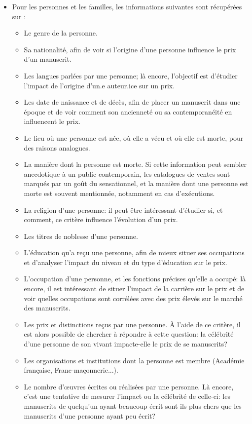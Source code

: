 \begin{itemize}
	\item Pour les personnes et les familles, les informations suivantes sont récupérées sur \wkd{}:
	\begin{itemize}
		\item Le genre de la personne.
		\item Sa nationalité, afin de voir si l'origine d'une personne influence le prix d'un manuscrit.
		\item Les langues parlées par une personne; là encore, l'objectif est d'étudier l'impact de l'origine d'un.e auteur.ice sur un prix.
		\item Les date de naissance et de décès, afin de placer un manuscrit dans une époque et de voir comment son ancienneté ou sa contemporanéité en influencent le prix.
		\item Le lieu où une personne est née, où elle a vécu et où elle est morte, pour des raisons analogues.
		\item La manière dont la personne est morte. Si cette information peut sembler anecdotique à un public contemporain, les catalogues de ventes sont marqués par un goût du sensationnel, et la manière dont une personne est morte est souvent mentionnée, notamment en cas d'exécutions.
		\item La religion d'une personne: il peut être intéressant d'étudier si, et comment, ce critère influence l'évolution d'un prix.
		\item Les titres de noblesse d'une personne.
		\item L'éducation qu'a reçu une personne, afin de mieux situer ses occupations et d'analyser l'impact du niveau et du type d'éducation sur le prix.
		\item L'occupation d'une personne, et les fonctions précises qu'elle a occupé: là encore, il est intéressant de situer l'impact de la carrière sur le prix et de voir quelles occupations sont corrélées avec des prix élevés sur le marché des manuscrits.
		\item Les prix et distinctions reçus par une personne. À l'aide de ce critère, il est alors possible de chercher à répondre à cette question: la célébrité d'une personne de son vivant impacte-elle le prix de se manuscrits?
		\item Les organisations et institutions dont la personne est membre (Académie française, Franc-maçonnerie...).
		\item Le nombre d'œuvres écrites ou réalisées par une personne. Là encore, c'est une tentative de mesurer l'impact ou la célébrité de celle-ci: les manuscrits de quelqu'un ayant beaucoup écrit sont ils plus chers que les manuscrits d'une personne ayant peu écrit?

\end{itemize}
\end{itemize}
